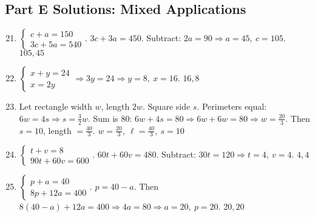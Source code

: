 \documentclass[12pt]{article}
\begin{document}
\subsection*{Part E Solutions: Mixed Applications}
\begin{enumerate}
  \setcounter{enumi}{20}
  \item \(\begin{cases} c+a=150 \\ 3c+5a=540 \end{cases}\).  
  \(3c+3a=450\). Subtract: \(2a=90 \Rightarrow a=45,\ c=105\). \(\boxed{105,45}\)

  \item \(\begin{cases} x+y=24 \\ x=2y \end{cases}\Rightarrow 3y=24 \Rightarrow y=8,\ x=16\). \(\boxed{16,8}\)

  \item Let rectangle width \(w\), length \(2w\). Square side \(s\).  
  Perimeters equal: \(6w=4s \Rightarrow s=\tfrac{3}{2}w\). Sum is 80: \(6w+4s=80 \Rightarrow 6w+6w=80 \Rightarrow w=\tfrac{20}{3}\).  
  Then \(s=10\), length \(=\tfrac{40}{3}\). \(\boxed{w=\tfrac{20}{3},\ \ell=\tfrac{40}{3},\ s=10}\)

  \item \(\begin{cases} t+v=8 \\ 90t+60v=600 \end{cases}\).  
  \(60t+60v=480\). Subtract: \(30t=120 \Rightarrow t=4,\ v=4\). \(\boxed{4,4}\)

  \item \(\begin{cases} p+a=40 \\ 8p+12a=400 \end{cases}\).  
  \(p=40-a\). Then \(8(40-a)+12a=400 \Rightarrow 4a=80 \Rightarrow a=20,\ p=20\). \(\boxed{20,20}\)
\end{enumerate}
\end{document}
